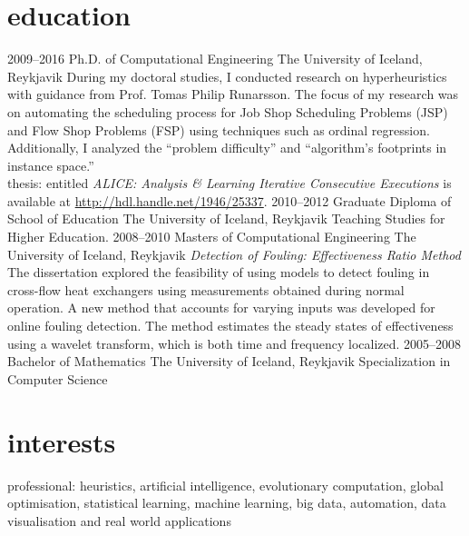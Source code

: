 \documentclass[]{cv} %
\begin{document}
\section{education}
\begin{entrylist}
\entry
{2009--2016}
{Ph.D. {\normalfont of Computational Engineering}}
{The University of Iceland, Reykjavik}
{During my doctoral studies, I conducted research on hyperheuristics with guidance from Prof. Tomas Philip Runarsson. The focus of my research was on automating the scheduling process for Job Shop Scheduling Problems (JSP) and Flow Shop Problems (FSP) using techniques such as ordinal regression. Additionally, I analyzed the ``problem difficulty'' and ``algorithm's footprints in instance space.''  \\
{\boldfont thesis:} entitled \emph{ALICE: Analysis \& Learning Iterative 
Consecutive Executions} is available at \url{http://hdl.handle.net/1946/25337}.}
\entry
{2010--2012}
{Graduate Diploma {\normalfont of School of Education}}
{The University of Iceland, Reykjavik}
{Teaching Studies for Higher Education.}
\entry
{2008--2010}
{Masters {\normalfont of Computational Engineering}}
{The University of Iceland, Reykjavik}
{\emph{Detection of Fouling: Effectiveness Ratio Method} \\ 
The dissertation explored the feasibility of using models to detect fouling in cross-flow heat exchangers using measurements obtained during normal operation. A new method that accounts for varying inputs was developed for online fouling detection. The method estimates the steady states of effectiveness using a wavelet transform, which is both time and frequency localized. }
\entry
{2005--2008}
{Bachelor {\normalfont of Mathematics}}
{The University of Iceland, Reykjavik}
{Specialization in Computer Science}
\end{entrylist}


\section{interests}
{\boldfont professional:} heuristics, artificial intelligence, evolutionary 
computation, global optimisation, statistical learning, machine learning, big data, automation, data visualisation and real world applications 
\end{document}
